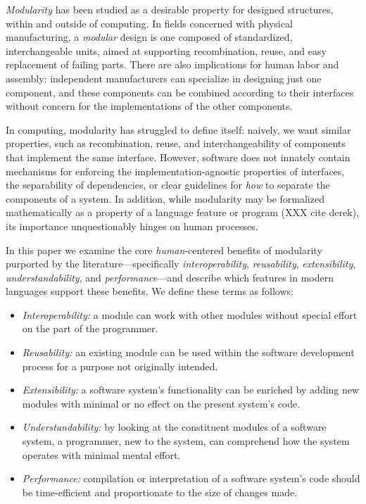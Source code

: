 \documentclass{sigplanconf}[10pt]
\begin{document}
{\em Modularity} has been studied as a desirable property for designed
structures, within and outside of computing. In fields concerned with
physical manufacturing, a {\em modular} design is one composed of
standardized, interchangeable units, aimed at supporting recombination,
reuse, and easy replacement of failing parts. There are also implications
for human labor and assembly: independent manufacturers can specialize in
designing just one component, and these components can be combined
according to their interfaces without concern for the implementations of
the other components.  

In computing, modularity has struggled to define itself: naively, we want
similar properties, such as recombination, reuse, and interchangeability of
components that implement the same interface. However, software does not
innately contain mechanisms for enforcing the implementation-agnostic
properties of interfaces, the separability of dependencies, or clear
guidelines for {\em how} to separate the components of a system.  In addition, while
modularity may be formalized mathematically as a property of a language
feature or program (XXX cite derek), its importance unquestionably hinges
on human processes. 

In this paper we examine the core {\em human}-centered benefits of
modularity purported by the literature---specifically {\em
interoperability}, {\em reusability}, {\em extensibility}, {\em understandability},
and {\em performance}---and describe which features in modern languages
support these benefits. 
We define these terms as follows:

\begin{itemize}
  \item {\em Interoperability:} a module can work with other modules 
  without special effort on the part of the programmer.
  \item {\em Reusability:} an existing module can be used within the software
    development process for a purpose not originally intended.
  \item {\em Extensibility:} a software system's functionality can be enriched
    by adding new modules with minimal or no effect on the present system's 
    code.
  \item {\em Understandability:} by looking at the constituent modules of a 
    software system, a programmer, new to the system, can comprehend how 
    the system operates with minimal mental effort.
  \item {\em Performance:} compilation or interpretation of a software system's
    code should be time-efficient and proportionate to the size of changes made.
\end{itemize}
\end{document}
